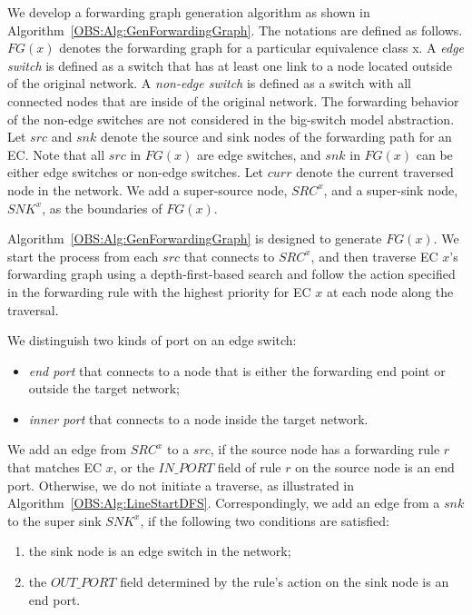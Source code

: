 We develop a forwarding graph generation algorithm as shown in Algorithm~\ref{OBS:Alg:GenForwardingGraph}.
The notations are defined as follows.
$FG(x)$ denotes the forwarding graph for a particular equivalence class x.
A \textit{edge switch} is defined as a switch that has at least one link to a node located outside of the original network. 
A \textit{non-edge switch} is defined as a switch with all connected nodes that are inside of the original network.
The forwarding behavior of the non-edge switches are not considered in the big-switch model abstraction.
Let $src$ and $snk$ denote the source and sink nodes of the forwarding path for an EC.
Note that all $src$ in $FG(x)$ are edge switches,
and $snk$ in $FG(x)$ can be either edge switches or non-edge switches.
Let $curr$ denote the current traversed node in the network.
We add a super-source node, $SRC^x$, and a super-sink node, $SNK^x$, as the boundaries of $FG(x)$.

Algorithm~\ref{OBS:Alg:GenForwardingGraph} is designed to generate $FG(x)$.
We start the process from each $src$ that connects to $SRC^x$,
and then traverse EC $x$'s forwarding graph using a depth-first-based search and
follow the action specified in the forwarding rule with the highest priority for EC $x$ at each node along the traversal.


We distinguish two kinds of port on an edge switch:
\begin{itemize}
    \item \textit{end port} that connects to a node that is either the forwarding end point or outside the target network;
    \item \textit{inner port} that connects to a node inside the target network.
\end{itemize}

We add an edge from $SRC^x$ to a $src$, if the source node has a forwarding rule $r$ that matches EC $x$, or the $IN\_PORT$ field of rule $r$ on the source node is an end port.
Otherwise, we do not initiate a traverse, as illustrated in Algorithm~\ref{OBS:Alg:LineStartDFS}.
Correspondingly, we add an edge from a $snk$ to the super sink $SNK^x$, if the following two conditions are satisfied:
\begin{enumerate}
    \item the sink node is an edge switch in the network;
    \item the $OUT\_PORT$ field determined by the rule's action on the sink node is an end port.
\end{enumerate}

